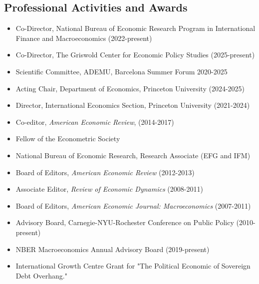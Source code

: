 \documentclass[12pt]{article}
\begin{document}
\subsection*{Professional Activities and Awards}

\begin{itemize}[left=0pt .. \parindent, label=]

\item Co-Director, National Bureau of Economic Research Program in International Finance and Macroeconomics (2022-present)  

\item Co-Director, The Griswold Center for Economic Policy Studies (2025-present) 

\item Scientific Committee, ADEMU, Barcelona Summer Forum 2020-2025 

\item  Acting Chair, Department of Economics, Princeton University (2024-2025)

\item Director, International Economics Section, Princeton University (2021-2024)
  
\item Co-editor, \textit{American Economic Review}, (2014-2017)

\item Fellow of the Econometric Society

\item National Bureau of Economic Research, Research Associate (EFG and IFM)

\item Board of Editors, \textit{American Economic Review} (2012-2013)

\item Associate Editor, \textit{Review of Economic Dynamics} (2008-2011)

\item Board of Editors, \textit{American Economic Journal: Macroeconomics}
(2007-2011)

\item Advisory Board, Carnegie-NYU-Rochester Conference on Public Policy
(2010-present)

\item NBER Macroeconomics Annual Advisory Board (2019-present)

\item International Growth Centre Grant for "The Political Economic of
Sovereign Debt Overhang."


\end{itemize}
\end{document}
